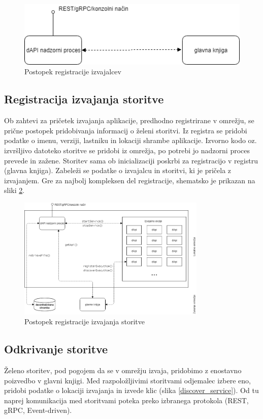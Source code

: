 \documentclass[a4paper, 12pt]{book}
\begin{document}
\begin{figure}[h]
	\centering
	\includegraphics[width=1.0\textwidth]{slike/register_worker.png}
	\caption{Postopek registracije izvajalcev}
	\label{register_worker}
\end{figure}

\subsection{Registracija izvajanja storitve}
\label{registerExecution}
Ob zahtevi za pričetek izvajanja aplikacije, predhodno registrirane v omrežju, se prične postopek pridobivanja informacij o želeni storitvi.
Iz registra se pridobi podatke o imenu, verziji, lastniku in lokaciji shrambe aplikacije.
Izvorno kodo oz. izvršljivo datoteko storitve se pridobi iz omrežja, po potrebi jo nadzorni proces prevede in zažene.
Storitev sama ob inicializaciji poskrbi za registracijo v registru (glavna knjiga).
Zabeleži se podatke o izvajalcu in storitvi, ki je pričela z izvajanjem.
Gre za najbolj kompleksen del registracije, shematsko je prikazan na sliki \ref{register_service}.

\begin{figure}[h]
	\centering
	\includegraphics[width=0.8\textwidth]{slike/register_service.png}
	\caption{Postopek registracije izvajanja storitve}
	\label{register_service}
\end{figure}

\subsection{Odkrivanje storitve}
\label{serviceDiscovery}
Želeno storitev, pod pogojem da se v omrežju izvaja, pridobimo z enostavno poizvedbo v glavni knjigi.
Med razpoložljivimi storitvami odjemalec izbere eno, pridobi podatke o lokaciji izvajanja in izvede klic (slika  \ref{discover_service}).
Od tu naprej komunikacija med storitvami poteka preko izbranega protokola (REST, gRPC, Event-driven).
\end{document}
